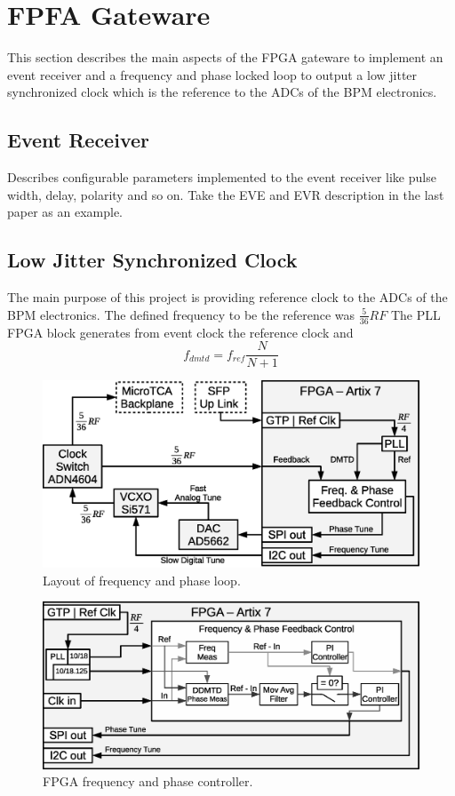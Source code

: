 \documentclass[a4paper,
               biblatex,      %
               ]{jacow}
\begin{document}
\section{FPFA Gateware}

This section describes the main aspects of the FPGA gateware to implement an event receiver and a frequency and phase locked loop to output a low jitter synchronized clock which is the reference to the ADCs of the BPM electronics.

\subsection{Event Receiver}

Describes configurable parameters implemented to the event receiver like pulse width, delay, polarity and so on. Take the EVE and EVR description in the last paper as an example.

\subsection{Low Jitter Synchronized Clock}
The main purpose of this project is providing reference clock to the ADCs of the BPM electronics. The defined frequency to be the reference was $\frac{5}{36}RF$
The PLL FPGA block generates from event clock the reference clock and  
\[f_{dmtd} = f_{ref}\frac{N}{N+1}\]

\begin{figure}[!htb]
   \centering
   \includegraphics*[width=0.8\columnwidth]{AFCRefClockLoop}
   \caption{Layout of frequency and phase loop.}
   \label{fig:AFCRefClockLoop}
\end{figure}

\begin{figure}[!htb]
   \centering
   \includegraphics*[width=0.8\columnwidth]{AFCFPGADMTD}
   \caption{FPGA frequency and phase controller.}
   \label{fig:AFCFPGADMTD}
\end{figure}
\end{document}
